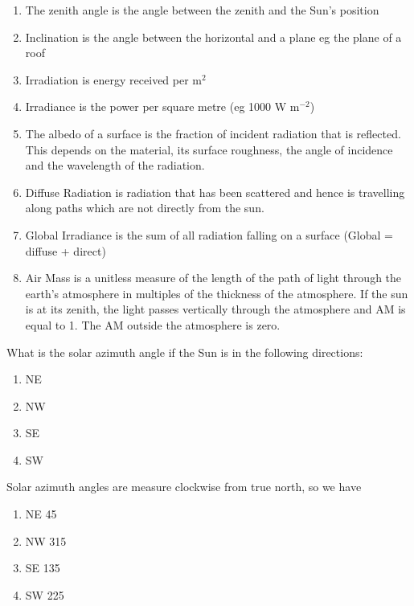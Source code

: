 \documentclass{article} %
\begin{document}
\begin{solution}
\begin{enumerate}[label=\alph*)]
        \item The zenith angle is the angle between the zenith and the Sun's position
        \item Inclination is the angle between the horizontal and a plane eg the plane of a roof
        \item Irradiation is energy received per m$^2$
        \item Irradiance is the power per square metre (eg 1000 W m$^{-2}$)
        \item The albedo of a surface is the fraction of incident radiation that is reflected. This depends on the material, its surface roughness, the angle of incidence and the wavelength of the radiation.
        \item Diffuse Radiation is radiation that has been scattered and hence is travelling along paths which are not directly from the sun.
        \item Global Irradiance is the sum of all radiation falling on a surface (Global = diffuse + direct) 
        \item Air Mass is a unitless measure of the length of the path of light through  the earth's atmosphere in multiples of the thickness of the atmosphere. If the sun is at its zenith, the light passes vertically through the atmosphere and AM is equal to 1. The AM outside the atmosphere is zero.
    \end{enumerate}
\end{solution}

\begin{question}
What is the solar azimuth angle if the Sun is in the following directions:
    \begin{enumerate}
    \item NE
    \item NW
    \item SE
    \item SW
    \end{enumerate}
\end{question}
\begin{solution}
Solar azimuth angles are measure clockwise from true north, so we have
    \begin{enumerate}
    \item NE 45\degree
    \item NW 315\degree
    \item SE 135\degree
    \item SW 225\degree
    \end{enumerate}
\end{solution}
\end{document}
